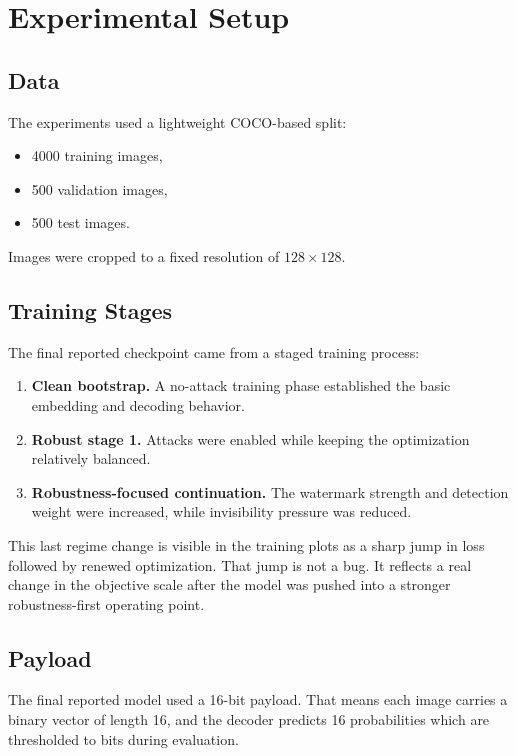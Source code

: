 \documentclass[11pt]{article}
\begin{document}
\section{Experimental Setup}
\subsection{Data}
The experiments used a lightweight COCO-based split:

\begin{itemize}[leftmargin=1.5em]
  \item 4000 training images,
  \item 500 validation images,
  \item 500 test images.
\end{itemize}

Images were cropped to a fixed resolution of $128 \times 128$.

\subsection{Training Stages}
The final reported checkpoint came from a staged training process:

\begin{enumerate}[leftmargin=1.5em]
  \item \textbf{Clean bootstrap.} A no-attack training phase established the basic embedding and decoding behavior.
  \item \textbf{Robust stage 1.} Attacks were enabled while keeping the optimization relatively balanced.
  \item \textbf{Robustness-focused continuation.} The watermark strength and detection weight were increased, while invisibility pressure was reduced.
\end{enumerate}

This last regime change is visible in the training plots as a sharp jump in loss followed by renewed optimization. That jump is not a bug. It reflects a real change in the objective scale after the model was pushed into a stronger robustness-first operating point.

\subsection{Payload}
The final reported model used a 16-bit payload. That means each image carries a binary vector of length 16, and the decoder predicts 16 probabilities which are thresholded to bits during evaluation.
\end{document}
